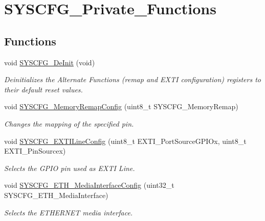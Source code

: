 \hypertarget{group___s_y_s_c_f_g___private___functions}{\section{S\-Y\-S\-C\-F\-G\-\_\-\-Private\-\_\-\-Functions}
\label{group___s_y_s_c_f_g___private___functions}
}
\subsection*{Functions}
\begin{DoxyCompactItemize}
\item 
void \hyperlink{group___s_y_s_c_f_g___private___functions_gaf2f9faa2df9a59a68ae17fae23bc478e}{S\-Y\-S\-C\-F\-G\-\_\-\-De\-Init} (void)
\begin{DoxyCompactList}\small\item\em Deinitializes the Alternate Functions (remap and E\-X\-T\-I configuration) registers to their default reset values. \end{DoxyCompactList}\item 
void \hyperlink{group___s_y_s_c_f_g___private___functions_ga09a5712f6c66ba5f0e0eeba30bc1e20d}{S\-Y\-S\-C\-F\-G\-\_\-\-Memory\-Remap\-Config} (uint8\-\_\-t S\-Y\-S\-C\-F\-G\-\_\-\-Memory\-Remap)
\begin{DoxyCompactList}\small\item\em Changes the mapping of the specified pin. \end{DoxyCompactList}\item 
void \hyperlink{group___s_y_s_c_f_g___private___functions_gafedab1f64cef720aeafeafd409ba6ae7}{S\-Y\-S\-C\-F\-G\-\_\-\-E\-X\-T\-I\-Line\-Config} (uint8\-\_\-t E\-X\-T\-I\-\_\-\-Port\-Source\-G\-P\-I\-Ox, uint8\-\_\-t E\-X\-T\-I\-\_\-\-Pin\-Sourcex)
\begin{DoxyCompactList}\small\item\em Selects the G\-P\-I\-O pin used as E\-X\-T\-I Line. \end{DoxyCompactList}\item 
void \hyperlink{group___s_y_s_c_f_g___private___functions_gabec494266ebbbde0279ad1d16c3065d0}{S\-Y\-S\-C\-F\-G\-\_\-\-E\-T\-H\-\_\-\-Media\-Interface\-Config} (uint32\-\_\-t S\-Y\-S\-C\-F\-G\-\_\-\-E\-T\-H\-\_\-\-Media\-Interface)
\begin{DoxyCompactList}\small\item\em Selects the E\-T\-H\-E\-R\-N\-E\-T media interface. \end{DoxyCompactList}\item 

\end{DoxyCompactItemize}
